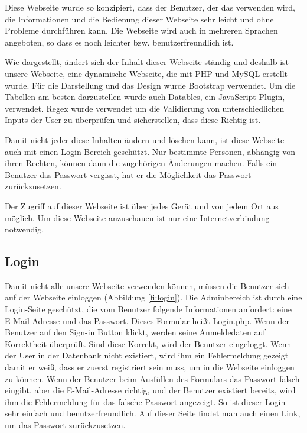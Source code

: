 Diese Webseite wurde so konzipiert, dass der Benutzer, der das verwenden wird, die Informationen und die Bedienung dieser Webseite sehr leicht und ohne Probleme durchf\"uhren kann. Die Webseite wird auch in mehreren Sprachen angeboten, so dass es noch leichter bzw. benutzerfreundlich ist.


Wie dargestellt, \"{a}ndert sich der Inhalt dieser Webseite  st\"{a}ndig und deshalb ist unsere Webseite, eine dynamische Webseite, die mit PHP und MySQL erstellt wurde. F\"{u}r die Darstellung und das Design wurde Bootstrap verwendet. Um die Tabellen am besten darzustellen wurde auch Datables, ein JavaScript Plugin, verwendet. Regex wurde verwendet um die Validierung von unterschiedlichen Inputs der User zu \"{u}berpr\"{u}fen und sicherstellen, dass diese Richtig ist.


Damit nicht jeder diese Inhalten \"{a}ndern und l\"{o}schen kann, ist diese Webseite auch mit einen Login Bereich gesch\"{u}tzt. Nur bestimmte Personen, abh\"{a}ngig von ihren Rechten, k\"{o}nnen dann die zugeh\"{o}rigen \"{A}nderungen machen. Falls ein Benutzer das Passwort vergisst, hat er die M\"{o}glichkeit das Passwort zur\"{u}ckzusetzen.


Der Zugriff auf dieser Webseite ist \"uber jedes Ger\"{a}t und von jedem Ort aus m\"{o}glich. Um diese Webseite anzuschauen ist nur eine Internetverbindung notwendig.

\subsection{Login}
Damit nicht alle unsere Webseite verwenden können, müssen die Benutzer sich auf der Webseite einloggen (Abbildung \ref{fi:login}). Die Adminbereich ist durch eine Login-Seite geschützt, die vom Benutzer folgende Informationen anfordert: eine E-Mail-Adresse und das Passwort. Dieses Formular heißt Login.php. Wenn der Benutzer auf den Sign-in Button klickt, werden seine Anmeldedaten auf Korrektheit überprüft. Sind diese Korrekt, wird der Benutzer eingeloggt. Wenn der User in der Datenbank nicht existiert, wird ihm ein Fehlermeldung gezeigt damit er weiß, dass er zuerst registriert sein muss, um in die Webseite einloggen zu können. Wenn der Benutzer beim Ausfüllen des Formulars das Passwort falsch eingibt, aber die E-Mail-Adresse richtig, und der Benutzer existiert bereits, wird ihm die Fehlermeldung für das falsche Passwort angezeigt. So ist dieser Login sehr einfach und benutzerfreundlich. Auf dieser Seite findet man auch einen Link, um das Passwort zurückzusetzen.

